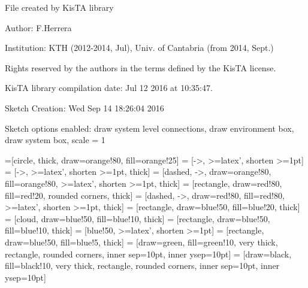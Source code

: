 \documentclass[a4paper,10pt]{article}
\begin{document}
File created by KisTA library

Author: F.Herrera

Institution: KTH (2012-2014, Jul), Univ. of Cantabria (from 2014, Sept.)

Rights reserved by the authors in the terms defined by the KisTA license.

KisTA library compilation date: Jul 12 2016 at 10:35:47.



Sketch Creation: Wed Sep 14 18:26:04 2016


Sketch options enabled:
draw system level connections, draw environment box, draw system box, scale = 1
\hfill


=[circle, thick, draw=orange!80, fill=orange!25]
 = [->, >=latex', shorten >=1pt]
 = [->, >=latex', shorten >=1pt, thick]
 = [dashed, ->, draw=orange!80, fill=orange!80, >=latex', shorten >=1pt, thick]
 = [rectangle, draw=red!80, fill=red!20, rounded corners, thick]
 = [dashed, ->, draw=red!80, fill=red!80, >=latex', shorten >=1pt, thick]
 = [rectangle, draw=blue!50, fill=blue!20, thick]
 = [cloud, draw=blue!50, fill=blue!10, thick]
 = [rectangle, draw=blue!50, fill=blue!10, thick]
 = [blue!50, >=latex', shorten >=1pt]
 = [rectangle, draw=blue!50,  fill=blue!5, thick]
 = [draw=green, fill=green!10, very thick, rectangle, rounded corners, inner sep=10pt, inner ysep=10pt]
 = [draw=black, fill=black!10, very thick, rectangle, rounded corners, inner sep=10pt, inner ysep=10pt]
\end{document}
